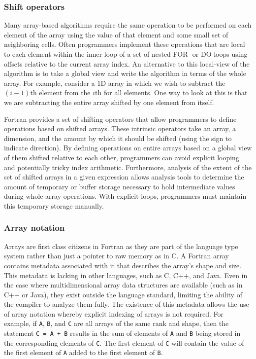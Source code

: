 \documentclass[10pt, conference, compsocconf]{IEEEtran}
\begin{document}
\subsubsection*{Shift operators}

Many array-based algorithms require the same operation to be performed
on each element of the array using the value of that element and some small
set of neighboring cells.  Often programmers implement these operations that
are local to each element within the inner-loop of a set of nested FOR-
or DO-loops using offsets relative to the current array index.  An alternative
to this local-view of the algorithm is to take a global view and write the
algorithm in terms of the whole array.  For example, consider a 1D array in
which we wish to subtract the $(i-1)$th element from the $i$th for all
elements.  One way to look at this is that we are subtracting the entire array
shifted by one element from itself.

Fortran provides a set of shifting operators that allow programmers to
define operations based on shifted arrays.  These intrinsic operators take
an array, a dimension, and the amount by which it should be shifted (using
the sign to indicate direction).  By defining operations on entire arrays
based on a global view of them shifted relative to each other, programmers can
avoid explicit looping and potentially tricky index arithmetic.  Furthermore,
analysis of the extent of the set of shifted arrays in a given expression
allows analysis tools to determine the amount of temporary or buffer storage
necessary to hold intermediate values during whole array operations.  With
explicit loops, programmers must maintain this temporary storage manually.

\subsubsection*{Array notation}

Arrays are first class citizens in Fortran as they are part of the language
type system rather than just a pointer to raw memory as in C. A Fortran array
contains metadata associated with it that describes the array's shape and
size. This metadata is lacking in other languages, such as C, C++, and Java.
Even in the case where multidimensional array data structures are available
(such as in C++ or Java), they exist outside the language standard, limiting
the ability of the compiler to analyze them fully. The existence of this
metadata allows the use of array notation whereby explicit indexing of arrays
is not required. For example, if {\tt A}, {\tt B}, and {\tt C} are all arrays
of the same rank and shape, then the statement {\tt C = A + B} results in the
sum of elements of {\tt A} and {\tt B} being stored in the corresponding
elements of {\tt C}. The first element of {\tt C} will contain the value of
the first element of {\tt A} added to the first element of {\tt B}.
\end{document}
